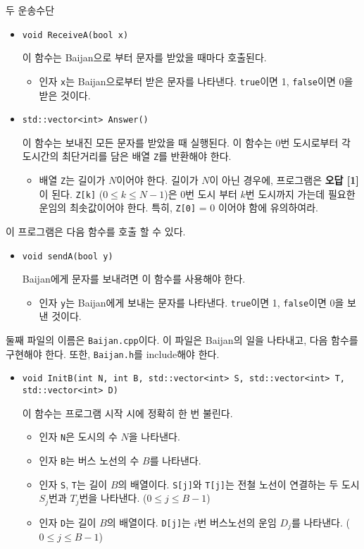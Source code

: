 \begin{problem}{두 운송수단}
\begin{itemize}
		\item \texttt{void ReceiveA(bool x)}
		
		이 함수는 Baijan으로 부터 문자를 받았을 때마다 호출된다.
		\begin{itemize}
			\item 인자 \texttt{x}는 Baijan으로부터 받은 문자를 나타낸다. \texttt{true}이면 1, \texttt{false}이면 0을 받은 것이다.
		\end{itemize}
		
		\item \texttt{std::vector<int> Answer()}
		
		이 함수는 보내진 모든 문자를 받았을 때 실행된다. 이 함수는 0번 도시로부터 각 도시간의 최단거리를 담은 배열 \texttt{Z}를 반환해야 한다.
		\begin{itemize}
			\item 배열 \texttt{Z}는 길이가 $N$이어야 한다. 길이가 $N$이 아닌 경우에, 프로그램은 \textbf{오답 [1]}이 된다.
			\texttt{Z[k]} ($0 \le k \le N-1$)은 0번 도시 부터 $k$번 도시까지 가는데 필요한 운임의 최솟값이어야 한다. 특히, \texttt{Z[0]} = 0 이어야 함에 유의하여라.
		\end{itemize}
	\end{itemize}

	이 프로그램은 다음 함수를 호출 할 수 있다.

	\begin{itemize}
		\item \texttt{void sendA(bool y)}
		
		Baijan에게 문자를 보내려면 이 함수를 사용해야 한다.
		
		\begin{itemize}
			\item 인자 \texttt{y}는 Baijan에게 보내는 문자를 나타낸다. \texttt{true}이면 1, \texttt{false}이면 0을 보낸 것이다.
		\end{itemize}
		
	\end{itemize}
		
	둘째 파일의 이름은 \texttt{Baijan.cpp}이다. 이 파일은 Baijan의 일을 나타내고, 다음 함수를 구현해야 한다. 또한, \texttt{Baijan.h}를 include해야 한다.

	\begin{itemize}
		\item \texttt{void InitB(int N, int B, std::vector<int> S, std::vector<int> T, std::vector<int> D)}
		
		이 함수는 프로그램 시작 시에 정확히 한 번 불린다.
		\begin{itemize}
			\item 인자 \texttt{N}은 도시의 수 $N$을 나타낸다.
			\item 인자 \texttt{B}는 버스 노선의 수 $B$를 나타낸다.
			\item 인자 \texttt{S}, \texttt{T}는 길이 $B$의 배열이다. \texttt{S[j]}와 \texttt{T[j]}는 전철 노선이 연결하는 두 도시 $S_j$번과 $T_j$번을 나타낸다. ($0 \le j \le B-1$)
			\item 인자 \texttt{D}는 길이 $B$의 배열이다. \texttt{D[j]}는 $i$번 버스노선의 운임 $D_j$를 나타낸다. ($0 \le j \le B-1$)
		\end{itemize}
		

\end{itemize}
\end{problem}
